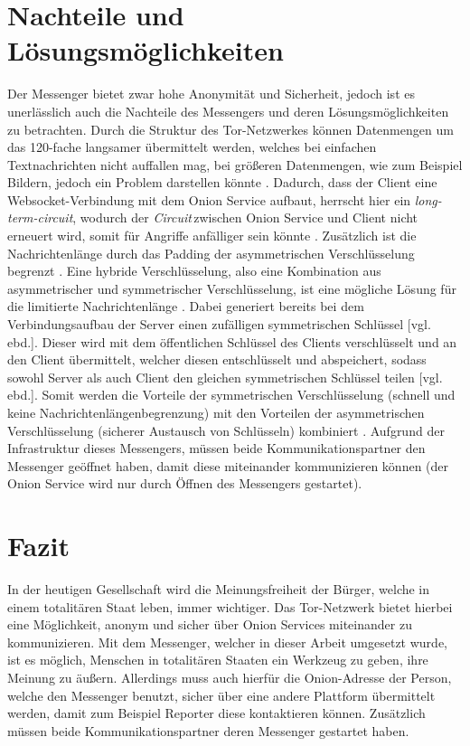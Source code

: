 \documentclass[a4paper,ngerman, headheight=28pt,12pt]{scrartcl}
\newcommand{\vcite}[1]{\cite[vgl.][]{#1}}
\newcommand{\vebd}{[vgl. ebd.]}
\newcommand{\circuit}{\textit{Circuit\,}}
\begin{document}
\section{Nachteile und Lösungsmöglichkeiten}
Der Messenger bietet zwar hohe Anonymität und Sicherheit, jedoch ist es unerlässlich auch die Nachteile des Messengers und deren Lösungsmöglichkeiten zu betrachten. Durch die Struktur des Tor-Netzwerkes können Datenmengen um das 120-fache langsamer übermittelt werden, welches bei einfachen Textnachrichten nicht auffallen mag, bei größeren Datenmengen, wie zum Beispiel Bildern, jedoch ein Problem darstellen könnte \vcite{TorPerformance}. Dadurch, dass der Client eine Websocket-Verbindung mit dem Onion Service aufbaut, herrscht hier ein \textit{long-term-circuit}, wodurch der \circuit zwischen Onion Service und Client nicht erneuert wird, somit für Angriffe anfälliger sein könnte \vcite{FAQCircuitLifetime}. Zusätzlich ist die Nachrichtenlänge durch das Padding der asymmetrischen Verschlüsselung begrenzt \vcite{OpensslRsaMaxLength}.
Eine hybride Verschlüsselung, also eine Kombination aus asymmetrischer und symmetrischer Verschlüsselung, ist eine mögliche Lösung für die limitierte Nachrichtenlänge \vcite{HybridEncryption}. Dabei generiert bereits bei dem Verbindungsaufbau der Server einen zufälligen symmetrischen Schlüssel \vebd. Dieser wird mit dem öffentlichen Schlüssel des Clients verschlüsselt und an den Client übermittelt, welcher diesen entschlüsselt und abspeichert, sodass sowohl Server als auch Client den gleichen symmetrischen Schlüssel teilen \vebd.
Somit werden die Vorteile der symmetrischen Verschlüsselung (schnell und keine Nachrichtenlängenbegrenzung) mit den Vorteilen der asymmetrischen Verschlüsselung (sicherer Austausch von Schlüsseln) kombiniert \vcite{HybridTechnopedia}. Aufgrund der Infrastruktur dieses Messengers, müssen beide Kommunikationspartner den Messenger geöffnet haben, damit diese miteinander kommunizieren können (der Onion Service wird nur durch Öffnen des Messengers gestartet).

\section{Fazit}
In der heutigen Gesellschaft wird die Meinungsfreiheit der Bürger, welche in einem totalitären Staat leben, immer wichtiger. Das Tor-Netzwerk bietet hierbei eine Möglichkeit, anonym und sicher über Onion Services miteinander zu kommunizieren. Mit dem Messenger, welcher in dieser Arbeit umgesetzt wurde, ist es möglich, Menschen in totalitären Staaten ein Werkzeug zu geben, ihre Meinung zu äußern. Allerdings muss auch hierfür die Onion-Adresse der Person, welche den Messenger benutzt, sicher über eine andere Plattform übermittelt werden, damit zum Beispiel Reporter diese kontaktieren können. Zusätzlich müssen beide Kommunikationspartner deren Messenger gestartet haben.
\end{document}
